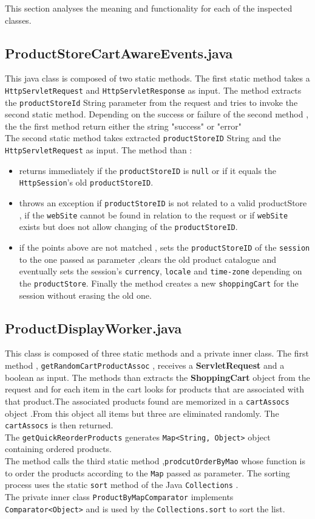 This section analyses the meaning and functionality for each of the inspected classes.\\ 
\subsection{ProductStoreCartAwareEvents.java}
\label{sub:PSCAE}
This java class is composed of two static methods.
The first static method takes a \texttt{HttpServletRequest} and \texttt{HttpServletResponse} as input. The method extracts the \texttt{productStoreId} String parameter from the request and tries to invoke the second static method. Depending on the success or failure of the second method ,	the the first method return either the string "success" or "error"\\
The second static method takes extracted \texttt{productStoreID} String and the \texttt{HttpServletRequest} as input. The method than :
\begin{itemize}
\item returns immediately  if the \texttt{productStoreID} is \texttt{null} or if it equals the \texttt{HttpSession}'s old \texttt{productStoreID}.
\item throws an exception if \texttt{productStoreID} is not related to a valid productStore , if the \texttt{webSite} cannot be found in relation to the request or if \texttt{webSite} exists but does not allow changing of the \texttt{productStoreID}.
\item if the points above are not matched , sets the \texttt{productStoreID} of the \texttt{session} to the one passed as parameter ,clears the old product catalogue and  eventually sets the session's \texttt{currency}, \texttt{locale} and \texttt{time-zone} depending on the \texttt{productStore}. Finally the method creates a new \texttt{shoppingCart} for the session without erasing the old one.
\end{itemize} 
\clearpage
\subsection{ProductDisplayWorker.java}
\label{sub:PDW}
This class is composed of three static methods and a private inner class.
The first method , \texttt{getRandomCartProductAssoc} , receives a \textbf{ServletRequest} and a boolean as input. The methods than extracts the \textbf{ShoppingCart} object from the request and for each item in the cart looks for products that are associated with that product.The associated products found are memorized in a \texttt{cartAssocs} object .From this object all items but three are eliminated randomly. The \texttt{cartAssocs} is then returned.\\
The \texttt{getQuickReorderProducts}   generates \texttt{Map<String, Object>} object containing ordered products. \\The method calls the third static method ,\texttt{prodcutOrderByMao} whose function is to order the products according to the \texttt{Map} passed as parameter. The sorting process uses the static \texttt{sort} method of the Java \texttt{Collections} .\\The private inner class \texttt{ProductByMapComparator} implements \texttt{Comparator<Object>} and is used by the \texttt{Collections.sort} to sort the list.
         